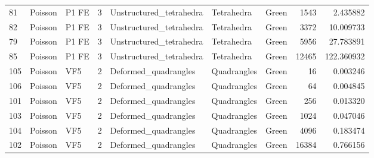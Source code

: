 \begin{tabular}{lllrlllrr}
81  &           Poisson &                          P1 FE &               3 &         Unstructured\_tetrahedra &             Tetrahedra  &                                Green &                     1543 &                         2.435882 \\
82  &           Poisson &                          P1 FE &               3 &         Unstructured\_tetrahedra &             Tetrahedra  &                                Green &                     3372 &                        10.009733 \\
79  &           Poisson &                          P1 FE &               3 &         Unstructured\_tetrahedra &             Tetrahedra  &                                Green &                     5956 &                        27.783891 \\
85  &           Poisson &                          P1 FE &               3 &         Unstructured\_tetrahedra &             Tetrahedra  &                                Green &                    12465 &                       122.360932 \\
105 &           Poisson &                            VF5 &               2 &            Deformed\_quadrangles &            Quadrangles  &                                Green &                       16 &                         0.003246 \\
106 &           Poisson &                            VF5 &               2 &            Deformed\_quadrangles &            Quadrangles  &                                Green &                       64 &                         0.004845 \\
101 &           Poisson &                            VF5 &               2 &            Deformed\_quadrangles &            Quadrangles  &                                Green &                      256 &                         0.013320 \\
103 &           Poisson &                            VF5 &               2 &            Deformed\_quadrangles &            Quadrangles  &                                Green &                     1024 &                         0.047046 \\
104 &           Poisson &                            VF5 &               2 &            Deformed\_quadrangles &            Quadrangles  &                                Green &                     4096 &                         0.183474 \\
102 &           Poisson &                            VF5 &               2 &            Deformed\_quadrangles &            Quadrangles  &                                Green &                    16384 &                         0.766156 \\

\end{tabular}
